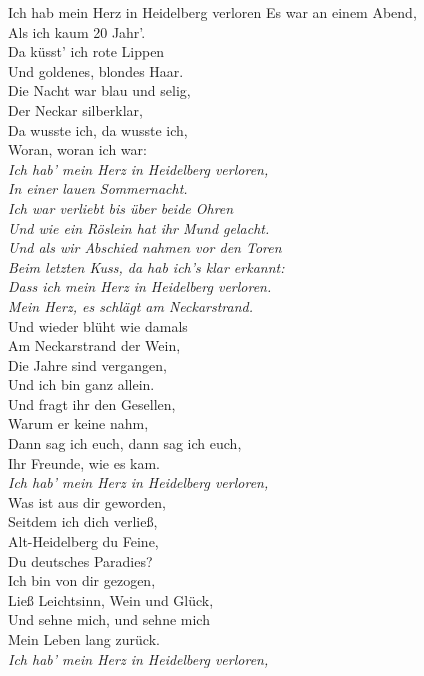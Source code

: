 
\begin{lied*}{Ich hab mein Herz in Heidelberg verloren}{}
Es war an einem Abend,\\
Als ich kaum 20 Jahr'.\\
Da küsst' ich rote Lippen\\
Und goldenes, blondes Haar.\\
Die Nacht war blau und selig,\\
Der Neckar silberklar,\\
Da wusste ich, da wusste ich,\\
Woran, woran ich war:\\

\textit{Ich hab' mein Herz in Heidelberg verloren,\\
In einer lauen Sommernacht.\\
Ich war verliebt bis über beide Ohren\\
Und wie ein Röslein hat ihr Mund gelacht.\\
Und als wir Abschied nahmen vor den Toren\\
Beim letzten Kuss, da hab ich's klar erkannt:\\
Dass ich mein Herz in Heidelberg verloren.\\
Mein Herz, es schlägt am Neckarstrand.}\\

Und wieder blüht wie damals\\
Am Neckarstrand der Wein,\\
Die Jahre sind vergangen,\\
Und ich bin ganz allein.\\
Und fragt ihr den Gesellen,\\
Warum er keine nahm,\\
Dann sag ich euch, dann sag ich euch,\\
Ihr Freunde, wie es kam.\\

\textit{Ich hab' mein Herz in Heidelberg verloren,}\\

Was ist aus dir geworden,\\
Seitdem ich dich verließ,\\
Alt-Heidelberg du Feine,\\
Du deutsches Paradies?\\
Ich bin von dir gezogen,\\
Ließ Leichtsinn, Wein und Glück,\\
Und sehne mich, und sehne mich\\
Mein Leben lang zurück.\\

\textit{Ich hab' mein Herz in Heidelberg verloren,}\\
\end{lied*}

